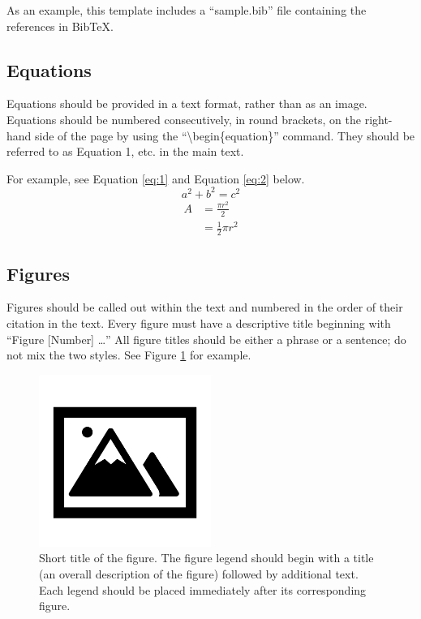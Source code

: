 \documentclass{article}
\begin{document}
As an example, this template includes a ``sample.bib'' file containing the references in BibTeX.

\subsection*{Equations}
Equations should be provided in a text format, rather than as an image. Equations should be numbered consecutively, in round brackets, on the right-hand side of the page by using the ``\textbackslash begin\{equation\}'' command. They should be referred to as Equation 1, etc. in the main text.

\medskip For example, see Equation \ref{eq:1} and Equation \ref{eq:2} below.
\begin{equation} \label{eq:1}
    a^2 + b^2 = c^2
\end{equation}
\begin{equation} \label{eq:2}
\begin{split}
A & = \frac{\pi r^2}{2} \\
 & = \frac{1}{2} \pi r^2
\end{split}
\end{equation}

\subsection*{Figures}
Figures should be called out within the text and numbered in the order of their citation in the text. Every figure must have a descriptive title beginning with ``Figure [Number] …'' All figure titles should be either a phrase or a sentence; do not mix the two styles. See Figure \ref{fig:1} for example.
\begin{figure}[h]
    \centering
    \includegraphics[width=0.5\textwidth]{fig 1}
    \caption{Short title of the figure. The figure legend should begin with a title (an overall description of the figure) followed by additional text. Each legend should be placed immediately after its corresponding figure.}
    \label{fig:1}
\end{figure}
\end{document}
